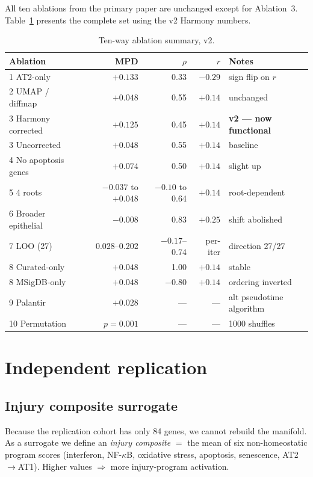 \documentclass[11pt]{article}
\begin{document}
All ten ablations from the primary paper are unchanged except for Ablation~3.
Table~\ref{tab:ablations-v2} presents the complete set using the v2 Harmony numbers.

\begin{table}[H]
\scriptsize
\centering
\begin{tabular}{lrrrl}
\toprule
Ablation & MPD & $\rho$ & $r$ & Notes \\
\midrule
1 AT2-only & $+0.133$ & 0.33 & $-0.29$ & sign flip on $r$ \\
2 UMAP / diffmap & $+0.048$ & 0.55 & $+0.14$ & unchanged \\
3 Harmony corrected & $+0.125$ & 0.45 & $+0.14$ & \textbf{v2 --- now functional} \\
3 Uncorrected & $+0.048$ & 0.55 & $+0.14$ & baseline \\
4 No apoptosis genes & $+0.074$ & 0.50 & $+0.14$ & slight up \\
5 4 roots & $-0.037$ to $+0.048$ & $-0.10$ to 0.64 & $+0.14$ & root-dependent \\
6 Broader epithelial & $-0.008$ & 0.83 & $+0.25$ & shift abolished \\
7 LOO (27) & 0.028--0.202 & $-0.17$--0.74 & per-iter & direction 27/27 \\
8 Curated-only & $+0.048$ & 1.00 & $+0.14$ & stable \\
8 MSigDB-only & $+0.048$ & $-0.80$ & $+0.14$ & ordering inverted \\
9 Palantir & $+0.028$ & --- & --- & alt pseudotime algorithm \\
10 Permutation & $p=0.001$ & --- & --- & 1000 shuffles \\
\bottomrule
\end{tabular}
\caption{Ten-way ablation summary, v2.}\label{tab:ablations-v2}
\end{table}

\section{Independent replication}\label{sec:replication}

\subsection{Injury composite surrogate}

Because the replication cohort has only 84 genes, we cannot rebuild the manifold.
As a surrogate we define an \emph{injury composite} $=$ the mean of six
non-homeostatic program scores (interferon, NF-$\kappa$B, oxidative stress, apoptosis,
senescence, AT2$\to$AT1). Higher values $\Rightarrow$ more injury-program activation.
\end{document}
